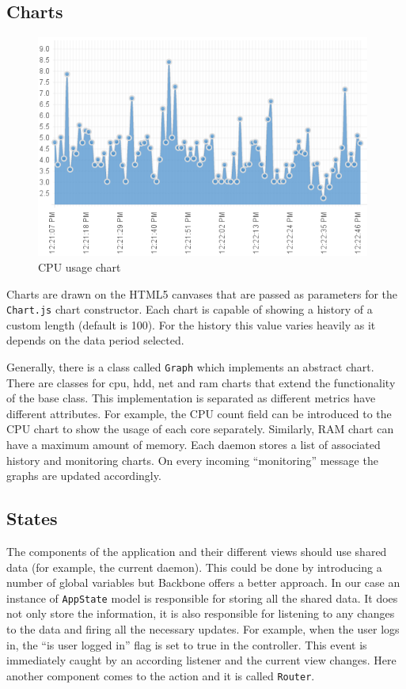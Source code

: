 \documentclass{l3proj}
\begin{document}
\subsection{Charts}

\begin{figure}[H]
\centering
\includegraphics[width=110mm]{images/cpu.png}
\caption{CPU usage chart}
\label{fig:CPUusage}
\end{figure}

Charts are drawn on the HTML5 canvases that are passed as parameters for the \texttt{Chart.js} chart constructor. Each chart is capable of showing a history of a custom length (default is 100). For the history this value varies heavily as it depends on the data period selected.

Generally, there is a class called \texttt{Graph} which implements an abstract chart. There are classes for cpu, hdd, net and ram charts that extend the functionality of the base class. This implementation is separated as different metrics have different attributes. For example, the CPU count field can be introduced to the CPU chart to show the usage of each core separately. Similarly, RAM chart can have a maximum amount of memory. Each daemon stores a list of associated history and monitoring charts. On every incoming ``monitoring'' message the graphs are updated accordingly.

\subsection{States}

The components of the application and their different views should use shared data (for example, the current daemon). This could be done by introducing a number of global variables but Backbone offers a better approach. In our case an instance of \texttt{AppState} model is responsible for storing all the shared data. It does not only store the information, it is also responsible for listening to any changes to the data and firing all the necessary updates. For example, when the user logs in, the ``is user logged in'' flag is set to true in the controller. This event is immediately caught by an according listener and the current view changes. Here another component comes to the action and it is called \texttt{Router}.
\end{document}
